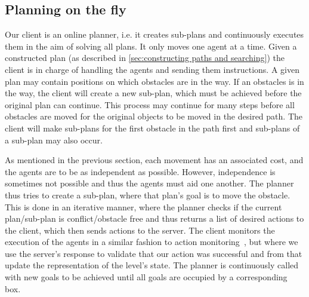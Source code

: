 \subsection{Planning on the fly}
\label{sec:planning on the fly}

Our client is an online planner, i.e. it creates sub-plans and continuously executes them in the aim of solving all plans.
It only moves one agent at a time.
Given a constructed plan (as described in \cref{sec:constructing paths and searching}) the client is in charge of handling the agents and sending them instructions.
A given plan may contain positions on which obstacles are in the way.
If an obstacles is in the way, the client will create a new sub-plan, which must be achieved before the original plan can continue.
This process may continue for many steps before all obstacles are moved for the original objects to be moved in the desired path.
The client will make sub-plans for the first obstacle in the path first and sub-plans of a sub-plan may also occur.

As mentioned in the previous section, each movement has an associated cost, and the agents are to be as independent as possible.
However, independence is sometimes not possible and thus the agents must aid one another.
The planner thus tries to create a sub-plan, where that plan's goal is to move the obstacle.
This is done in an iterative manner, where the planner checks if the current plan/sub-plan is conflict/obstacle free and thus returns a list of desired actions to the client, which then sends actions to the server.
The client monitors the execution of the agents in a similar fashion to action monitoring~\cite{russell2009modern}, but where we use the server's response to validate that our action was successful and from that update the representation of the level's state.
The planner is continuously called with new goals to be achieved until all goals are occupied by a corresponding box.
